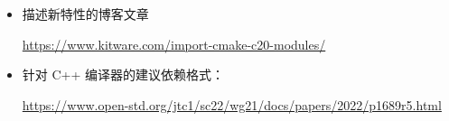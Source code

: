 
\begin{itemize}
\item
描述新特性的博客文章

\url{https://www.kitware.com/import-cmake-c20-modules/}

\item
针对 C++ 编译器的建议依赖格式：

\url{https://www.open-std.org/jtc1/sc22/wg21/docs/papers/2022/p1689r5.html}
\end{itemize}